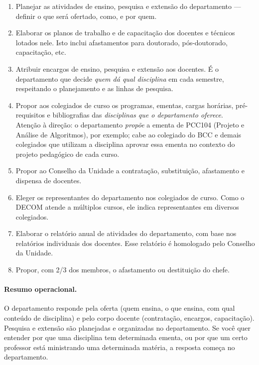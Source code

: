 \documentclass[10pt,a4paper]{extarticle}
\newcommand{\impt}[1]{\textcolor{important}{#1}}
\newcommand{\ntc}[1]{\textcolor{notice}{#1}}
\begin{document}
\begin{enumerate}[label=(\arabic*)]
    \item \impt{Planejar as atividades de ensino, pesquisa e extensão} do departamento --- definir o que será ofertado, como, e por quem.
    \item \impt{Elaborar os planos de trabalho e de capacitação} dos docentes e técnicos lotados nele. Isto inclui afastamentos para doutorado, pós-doutorado, capacitação, etc.
    \item \impt{Atribuir encargos de ensino, pesquisa e extensão} aos docentes. É o departamento que decide \emph{quem dá qual disciplina} em cada semestre, respeitando o planejamento e as linhas de pesquisa.
    \item \impt{Propor aos colegiados de curso} os programas, ementas, cargas horárias, pré-requisitos e bibliografias das \emph{disciplinas que o departamento oferece}.\\
    \ntc{Atenção à direção: o departamento \emph{propõe} a ementa de PCC104 (Projeto e Análise de Algoritmos), por exemplo; cabe ao colegiado do BCC e demais colegiados que utilizam a disciplina aprovar essa ementa no contexto do projeto pedagógico de cada curso.}
    \item \impt{Propor ao Conselho da Unidade} a contratação, substituição, afastamento e dispensa de docentes.
    \item \impt{Eleger os representantes do departamento nos colegiados de curso}. Como o DECOM atende a múltiplos cursos, ele indica representantes em diversos colegiados.
    \item \impt{Elaborar o relatório anual de atividades} do departamento, com base nos relatórios individuais dos docentes. Esse relatório é homologado pelo Conselho da Unidade.
    \item Propor, com 2/3 dos membros, o \impt{afastamento ou destituição do chefe}.
\end{enumerate}

\paragraph{Resumo operacional.} O departamento responde pela \impt{oferta} (quem ensina, o que ensina, com qual conteúdo de disciplina) e pelo \impt{corpo docente} (contratação, encargos, capacitação). Pesquisa e extensão são planejadas e organizadas no departamento. Se você quer entender por que uma disciplina tem determinada ementa, ou por que um certo professor está ministrando uma determinada matéria, a resposta começa no departamento.
\end{document}
